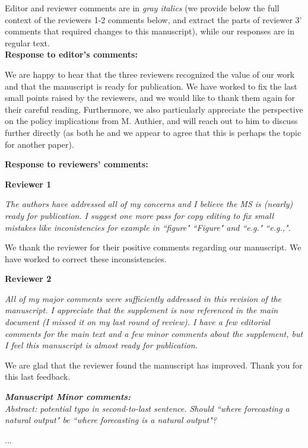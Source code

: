 \documentclass[11pt,letter]{article}
\begin{document}
\setlength{\parindent}{0cm}
\setlength{\parskip}{7pt}

Editor and reviewer comments are in \emph{gray italics} (we provide below the full context of the reviewers 1-2 comments below, and extract the parts of reviewer 3' comments that required changes to this manuscript), while our responses are in regular text. \\ 

{\bf Response to editor's comments:} 

We are happy to hear that the three reviewers recognized the value of our work and that the manuscript is ready for publication. We have worked to fix the last small points raised by the reviewers, and we would like to thank them again for their careful reading. Furthermore, we also particularly appreciate the perspective on the policy implications from M. Authier, and will reach out to him to discuss further directly (as both he and we appear to agree that this is perhaps the topic for another paper). 

{\bf Response to reviewers' comments:} 

{\bf Reviewer 1}

\begin{mybox}
\emph{The authors have addressed all of my concerns and I believe the MS is
(nearly) ready for publication. I suggest one more pass for copy editing
to fix small mistakes like inconistencies for example in ``figure"
``Figure" and ``e.g." ``e.g.,".}
\end{mybox}

We thank the reviewer for their positive comments regarding our manuscript. 
We have worked to correct these inconsistencies.

{\bf Reviewer 2}

\begin{mybox}
\emph{All of my major comments were sufficiently addressed in this revision of
the manuscript. I appreciate that the supplement is now referenced in
the main document (I missed it on my last round of review). I have a few
editorial comments for the main text and a few minor comments about the
supplement, but I feel this manuscript is almost ready for publication.}
\end{mybox}

We are glad that the reviewer found the manuscript has improved.
Thank you for this last feedback. 

\begin{mybox}
\emph{\textbf{Manuscript Minor comments:}\\
Abstract: potential typo in second-to-last sentence. Should ``where
forecasting a natural output" be ``where forecasting is a natural output"?}
\end{mybox}
...
\end{document}
